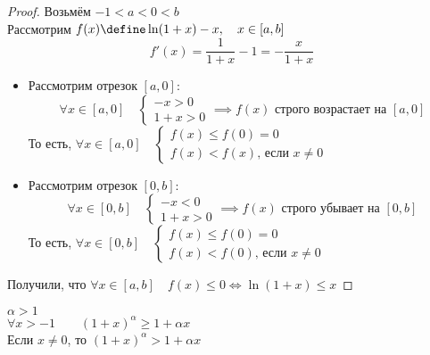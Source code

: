 \begin{proof}
	Возьмём $ -1 < a < 0 < b $ \\
    Рассмотрим $ f(x) \define \ln(1 + x) - x, \quad x \in [a, b] $
    $$ f'(x) = \frac1{1 + x} - 1 = -\frac{x}{1 + x} $$
    \begin{itemize}
    	\item Рассмотрим отрезок $[a, 0]$:
        $$ \forall x \in [a, 0] \quad
        \begin{cases}
            -x > 0 \\
            1 + x > 0
        \end{cases} \implies f(x) \text{ строго возрастает на } [a, 0] $$
        То есть, $ \forall x \in [a, 0] \quad
        \begin{cases}
            f(x) \le f(0) = 0 \\
            f(x) < f(x) \text{, если } x \ne 0
        \end{cases} $
        \item Рассмотрим отрезок $[0, b]$:
        $$ \forall x \in [0, b] \quad
        \begin{cases}
        	-x < 0 \\
            1 + x > 0
        \end{cases} \implies f(x) \text{ строго убывает на } [0, b] $$
        То есть, $\forall x \in [0, b] \quad
        \begin{cases}
        	f(x) \le f(0) = 0 \\
            f(x) < f(0) \text{, если } x \ne 0
        \end{cases} $
    \end{itemize}
    Получили, что $ \forall x \in [a, b] \quad f(x) \le 0 \iff \ln(1 + x) \le x $
\end{proof}

\begin{statement}
	$ \alpha > 1 $ \\
    $ \forall x > -1 \qquad (1 + x)^\alpha \ge 1 + \alpha x $ \\
    Если $ x \ne 0 $, то $ (1 + x)^\alpha > 1 + \alpha x $
\end{statement}


